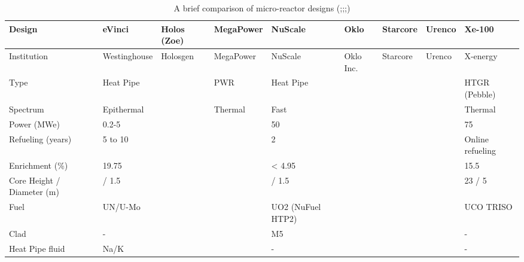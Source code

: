\documentclass[10pt,a4paper]{article}
\begin{document}
\pagebreak
{}
\begin{landscape}
\begin{table} [ht]
\begin{center}

\caption{A brief comparison of micro-reactor designs (\cite{Yan20};\cite{Arafat19};\cite{Levinsky18};\cite{IAEA18})}
\begin{tabular}{|l|l|l|l|l|l|l|l|l|}
\hline 
Design 		&eVinci 		& Holos (Zoe)		&MegaPower 	& NuScale		& Oklo 		& Starcore		& Urenco 		& Xe-100 \\ 
\hline 
Institution 	&Westinghouse& Holosgen	&MegaPower	& NuScale		& Oklo Inc. 	& Starcore		& Urenco 		& X-energy \\ 
\hline 
Type			&Heat Pipe	&   		  	& PWR 		& Heat Pipe	&   			&			&   			& HTGR (Pebble)\\ 
\hline 
Spectrum		&Epithermal	&  		 	& Thermal 	& Fast		&   			&   			&			&Thermal\\ 
\hline 
Power (MWe)	&0.2-5		&   			&			& 50 			&   			&   			&			&75\\ 
\hline
Refueling (years)&5 to 10		&   			&			& 2 			&   			&   			&			&Online refueling\\ 
\hline
Enrichment (\%)&19.75		&   			&			& {<} 4.95 		&   			&   			&			&15.5\\ 
\hline
Core Height / Diameter (m)	&/ 1.5		&   			&			& / 1.5 		&   			&   			&			&23 / 5\\ 
\hline
Fuel			&UN/U-Mo	&   			&			&UO2 (NuFuel HTP2)		&   			&   			&			&UCO TRISO\\ 
\hline
Clad			&-		&   			&			& M5 		&   			&   			&			&-\\ 
\hline
Heat Pipe fluid	&Na/K	&   			&			& - 		&   			&   			&			&-\\ 
\hline
\end{tabular}


\end{center}
\end{table}
\end{landscape}
\end{document}
